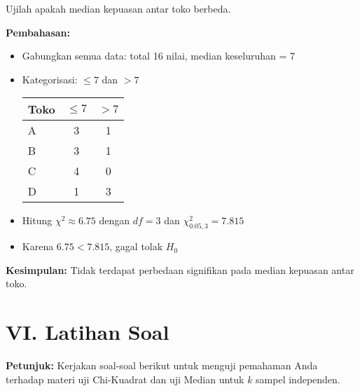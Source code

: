 \documentclass[12pt]{article}
\begin{document}
	Ujilah apakah median kepuasan antar toko berbeda.
	
	\textbf{Pembahasan:}
	\begin{itemize}
		\item Gabungkan semua data: total 16 nilai, median keseluruhan = 7
		\item Kategorisasi: $\leq 7$ dan $>7$
		
		\begin{center}
			\begin{tabular}{lcc}
				\toprule
				Toko & $\leq 7$ & $>7$ \\
				\midrule
				A & 3 & 1 \\
				B & 3 & 1 \\
				C & 4 & 0 \\
				D & 1 & 3 \\
				\bottomrule
			\end{tabular}
		\end{center}
		
		\item Hitung $\chi^2 \approx 6.75$ dengan $df = 3$ dan $\chi^2_{0.05, 3} = 7.815$
		\item Karena $6.75 < 7.815$, gagal tolak $H_0$
	\end{itemize}
	
	\textbf{Kesimpulan:} Tidak terdapat perbedaan signifikan pada median kepuasan antar toko.
	
	\section*{VI. Latihan Soal}
	
	\textbf{Petunjuk:} Kerjakan soal-soal berikut untuk menguji pemahaman Anda terhadap materi uji Chi-Kuadrat dan uji Median untuk $k$ sampel independen.
	
\end{document}
